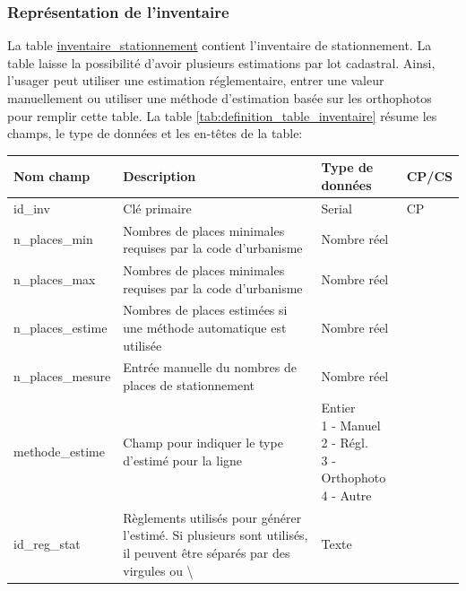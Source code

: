     \subsubsection{Représentation de l'inventaire}
    La table \underline{inventaire\_stationnement} contient l'inventaire de stationnement. La table laisse la possibilité d'avoir plusieurs estimations par lot cadastral. Ainsi, l'usager peut utiliser une estimation réglementaire, entrer une valeur manuellement ou utiliser une méthode d'estimation basée sur les orthophotos pour remplir cette table. La table \ref{tab:definition_table_inventaire} résume les champs, le type de données et les en-têtes de la table:
    \begin{table}[h]
        \centering
        \begin{tabular}{m{}|m{}m{}m{}}
            \hline
            Nom champ & Description & Type de données & CP/CS  \\
            \hline
            id\_inv & Clé primaire  & Serial & CP \\ \hline
            n\_places\_min & Nombres de places minimales requises par la code d'urbanisme & Nombre réel &\\ 
            n\_places\_max & Nombres de places minimales requises par la code d'urbanisme & Nombre réel & \\ 
            n\_places\_estime & Nombres de places estimées si une méthode automatique est utilisée & Nombre réel&\\ 
            n\_places\_mesure & Entrée manuelle du nombres de places de stationnement & Nombre réel&\\
            methode\_estime & Champ pour indiquer le type d'estimé pour la ligne & \makecell[l]{Entier\\
                                                                                             1 - Manuel\\
                                                                                             2 - Régl.\\
                                                                                             3 - Orthophoto\\
                                                                                             4 - Autre}  & \\ 
            id\_reg\_stat & Règlements utilisés pour générer l'estimé. Si plusieurs sont utilisés, il peuvent être séparés par des virgules ou \textbackslash & Texte & \\ 

\end{tabular}
\end{table}
